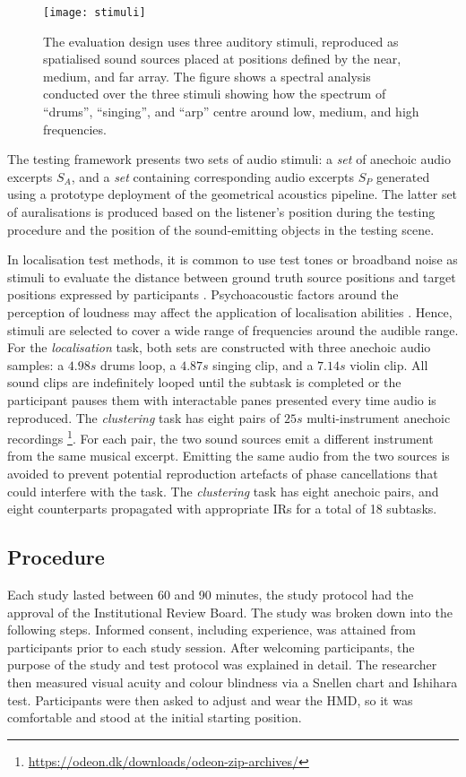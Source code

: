 \begin{figure}[htbp]
    \centering
    \texttt{[image: stimuli]}
    \caption{The evaluation design uses three auditory stimuli, reproduced as spatialised sound sources placed at positions defined by the near, medium, and far array. The figure shows a spectral analysis conducted over the three stimuli showing how the spectrum of ``drums'', ``singing'', and ``arp'' centre around low, medium, and high frequencies.}
    \label{fig:stimuli}
\end{figure}
The testing framework presents two sets of audio stimuli: a \emph{set} of anechoic audio excerpts $S_A$, and a \emph{set} containing corresponding audio excerpts $S_P$ generated using a prototype deployment of the geometrical acoustics pipeline. The latter set of auralisations is produced based on the listener's position during the testing procedure and the position of the sound-emitting objects in the testing scene. \par
In localisation test methods, it is common to use test tones or broadband noise as stimuli to evaluate the distance between ground truth source positions and target positions expressed by participants \citep{bertet2013investigation, kashino1998adaptation}. Psychoacoustic factors around the perception of loudness may affect the application of localisation abilities \citep{blauert1997spatial}. Hence, stimuli are selected to cover a wide range of frequencies around the audible range.
For the \emph{localisation} task, both sets are constructed with three anechoic audio samples: a $4.98s$ drums loop, a $4.87s$ singing clip, and a $7.14s$ violin clip. All sound clips are indefinitely looped until the subtask is completed or the participant pauses them with interactable panes presented every time audio is reproduced.
The \emph{clustering} task has eight pairs of $25s$ multi-instrument anechoic recordings \footnote{\url{https://odeon.dk/downloads/odeon-zip-archives/}}. For each pair, the two sound sources emit a different instrument from the same musical excerpt. Emitting the same audio from the two sources is avoided to prevent potential reproduction artefacts of phase cancellations that could interfere with the task. The \emph{clustering} task has eight anechoic pairs, and eight counterparts propagated with appropriate IRs for a total of 18 subtasks.

\subsection{Procedure}\label{sec:psy-procedure}
Each study lasted between 60 and 90 minutes, the study protocol had the approval of the Institutional Review Board. The study was broken down into the following steps. Informed consent, including experience, was attained from participants prior to each study session. After welcoming participants, the purpose of the study and test protocol was explained in detail. The researcher then measured visual acuity and colour blindness via a Snellen chart and Ishihara test. Participants were then asked to adjust and wear the HMD, so it was comfortable and stood at the initial starting position. 

